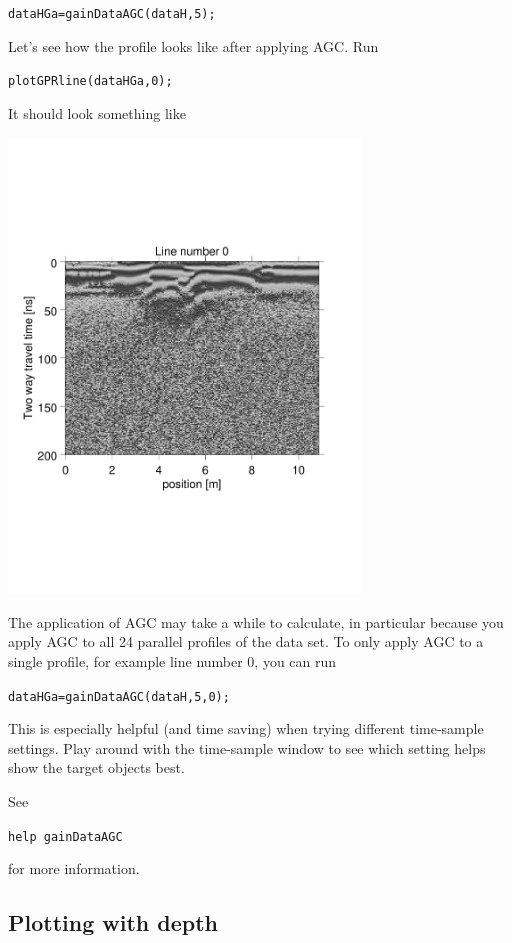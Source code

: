 \documentclass[11pt]{article}
\begin{document}
\qquad \verb#dataHGa=gainDataAGC(dataH,5);#

Let's see how the profile looks like after applying
AGC. Run

\qquad \verb#plotGPRline(dataHGa,0);#

It should look something like
\begin{center}
\includegraphics[width=0.7\textwidth, trim = 0.9cm 6cm 2cm
  6.5cm,clip]{figures/GPRlineHGa0}
\end{center}

The application of AGC may take a while to calculate, in particular
because you apply AGC to all 24 parallel profiles of the data set. To
only apply AGC to a single profile, for example line number 0, you can
run

\qquad \verb#dataHGa=gainDataAGC(dataH,5,0);#

This is especially helpful (and time saving) when trying different
time-sample settings. Play around with the time-sample window to see
which setting helps show the target objects best.

See

\qquad \verb#help gainDataAGC#

for more information.


\subsection{Plotting with depth}
\end{document}
